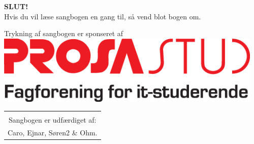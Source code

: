\newpage
\pagestyle{empty}
\begin{center}
{\Huge \textbf{SLUT!}}\\
\vspace{6cm}
{\large Hvis du vil læse sangbogen en gang til, så vend blot bogen
  om.}\\

\vspace{3cm}

{\large Trykning af sangbogen er sponseret af}
\includegraphics[width=0.96\textwidth]{res/prosalogo.eps}


\begin{tabular}{c}
\vspace{3cm}
\\
Sangbogen er udfærdiget af:\\
Caro, Ejnar, Søren2 \& Ohm.
\end{tabular}
\end{center}
